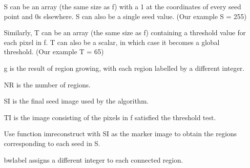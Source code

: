S can be an array (the same size as f) with a 1
at the coordinates of every seed point and 0s
elsewhere. S can also be a single seed value.
(Our example S = 255)

Similarly, T can be an array (the same size as
f) containing a threshold value for each pixel in
f. T can also be a scalar, in which case it
becomes a global threshold.
(Our example T = 65)

g is the result of region growing, with each
region labelled by a different integer.

NR is the number of regions.

SI is the final seed image used by the
algorithm.

TI is the image consisting of the pixels in f
satisfied the threshold test.

Use function imreconstruct with SI as the
marker image to obtain the regions
corresponding to each seed in S.

bwlabel assigns a different integer to each
connected region.

